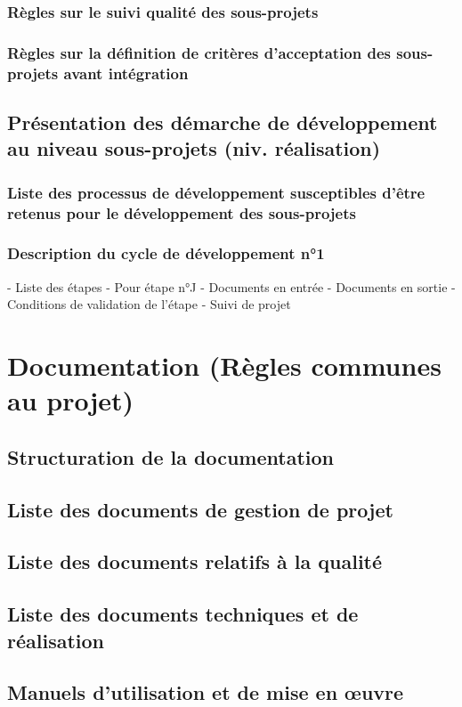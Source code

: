 \subsubsection{Règles sur le suivi qualité des sous-projets}
\subsubsection{Règles sur la définition de critères d’acceptation des sous-projets avant intégration}
\subsection{Présentation des démarche de développement au niveau sous-projets (niv. réalisation)}
\subsubsection{Liste des processus de développement susceptibles d’être retenus pour le développement des sous-projets}
\subsubsection{Description du cycle de développement n°1}
-	Liste des étapes
-	Pour étape n°J
-	Documents en entrée
-	Documents en sortie
-	Conditions de validation de l’étape
- Suivi de projet
 
\section{Documentation (Règles communes au projet)}
\subsection{Structuration de la documentation}
\subsection{Liste des documents de gestion de projet}
\subsection{Liste des documents relatifs à la qualité}
\subsection{Liste des documents techniques et de réalisation}
\subsection{Manuels d’utilisation et de mise en œuvre}

